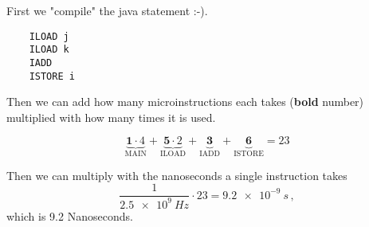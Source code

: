 First we "compile" the java statement :-).

\begin{verbatim}
    ILOAD j
    ILOAD k
    IADD
    ISTORE i
\end{verbatim}

Then we can add how many microinstructions each takes (\textbf{bold} number) multiplied with how many times it is used.

\[
\underbrace{\mathbf 1 \cdot 4}_{\mathrm{MAIN}} + \underbrace{\mathbf 5 \cdot 2}_{\mathrm{ILOAD}} + \underbrace{\mathbf 3}_{\mathrm{IADD}} + \underbrace{\mathbf 6}_{\mathrm{ISTORE}} = 23
\]

Then we can multiply with the nanoseconds a single instruction takes
\[
    \frac 1 {\SI{2.5e9}{Hz}} \cdot 23 = \SI{9.2e-9}{s}\,,
\]
which is 9.2 Nanoseconds.
